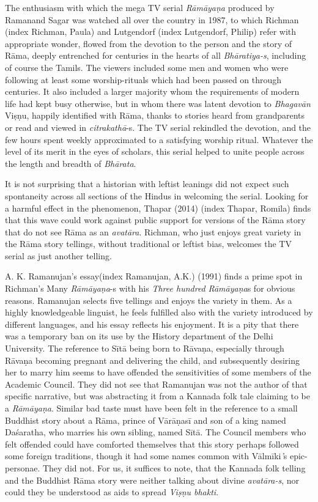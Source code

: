 \item The enthusiasm with which the mega TV serial \textit{Rāmāyaṇa} produced by Ramanand Sagar was watched all over the country in 1987, to which Richman (index Richman, Paula) and Lutgendorf (index Lutgendorf, Philip) refer with appropriate wonder, flowed from the devotion to the person and the story of Rāma, deeply entrenched for centuries in the hearts of all \textit{Bhāratiya-s}, including of course the Tamils. The viewers included some men and women who were following at least some worship-rituals which had been passed on through centuries. It also included a larger majority whom the requirements of modern life had kept busy otherwise, but in whom there was latent devotion to \textit{Bhagavān} Viṣṇu, happily identified with Rāma, thanks to stories heard from grandparents or read and viewed in \textit{citrakathā}-s. The TV serial rekindled the devotion, and the few hours spent weekly approximated to a satisfying worship ritual. Whatever the level of its merit in the eyes of scholars, this serial helped to unite people across the length and breadth of \textit{Bhārata}.

 \item It is not surprising that a historian with leftist leanings did not expect such spontaneity across all sections of the Hindus in welcoming the serial. Looking for a harmful effect in the phenomenon, Thapar (2014) (index Thapar, Romila) finds that this wave could work against public support for versions of the Rāma story that do not see Rāma as an \textit{avatāra}. Richman, who just enjoys great variety in the Rāma story tellings, without traditional or leftist bias, welcomes the TV serial as just another telling.

 \item A. K. Ramanujan’s essay(index Ramanujan, A.K.) (1991) finds a prime spot in Richman’s Many \textit{Rāmāyaṇa}-s with his \textit{Three hundred} \textit{Rāmāyaṇa}s for obvious reasons. Ramanujan selects five tellings and enjoys the variety in them. As a highly knowledgeable linguist, he feels fulfilled also with the variety introduced by different languages, and his essay reflects his enjoyment. It is a pity that there was a temporary ban on its use by the History department of the Delhi University. The reference to Sītā being born to Rāvaṇa, especially through Rāvaṇa becoming pregnant and delivering the child, and subsequently desiring her to marry him seems to have offended the sensitivities of some members of the Academic Council. They did not see that Ramanujan was not the author of that specific narrative, but was abstracting it from a Kannada folk tale claiming to be a \textit{Rāmāyaṇa}. Similar bad taste must have been felt in the reference to a small Buddhist story about a Rāma, prince of Vārāṇasī and son of a king named Daśaratha, who marries his own sibling, named Sītā. The Council members who felt offended could have comforted themselves that this story perhaps followed some foreign traditions, though it had some names common with Vālmīki\textit{’}s epic-personae. They did not. For us, it suffices to note, that the Kannada folk telling and the Buddhist Rāma story were neither talking about divine \textit{avatāra-s}, nor could they be understood as aids to spread \textit{Viṣṇu bhakti}.

